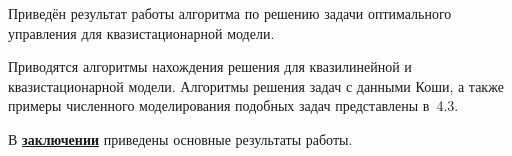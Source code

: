Приведён результат работы алгоритма по решению задачи оптимального
управления для квазистационарной модели.

Приводятся алгоритмы нахождения решения для квазилинейной и квазистационарной модели.
Алгоритмы решения задач с данными Коши, а также примеры численного моделирования подобных задач
представлены в~4.3.



\FloatBarrier
{}                                  %
В \underline{\textbf{заключении}} приведены основные результаты работы.


